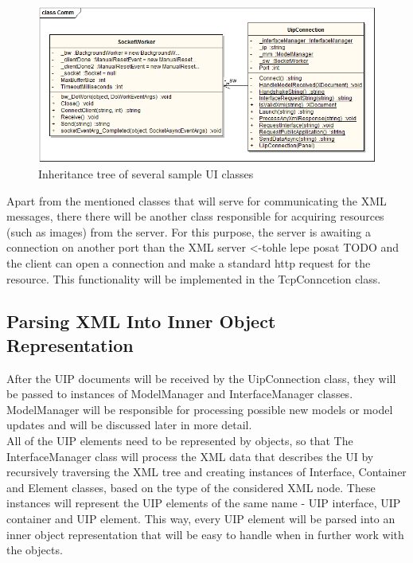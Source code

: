 \begin{figure}[ht!]
\centering
\includegraphics[width=145mm]{pics/3/classComm.png}
\caption{Inheritance tree of several sample UI classes}
\label{fig:classComm}
\end{figure}

Apart from the mentioned classes that will serve for communicating the XML messages, there there will be another class responsible for acquiring resources (such as images) from the server. For this purpose, the server is awaiting a connection on another port than the XML server <-tohle lepe posat TODO and the client can open a connection and make a standard http request for the resource. This functionality will be implemented in the TcpConncetion class.

\subsection{Parsing XML Into Inner Object Representation}
After the UIP documents will be received by the UipConnection class, they will be passed to instances of ModelManager and InterfaceManager classes. ModelManager will be responsible for processing possible new models or model updates and will be discussed later in more detail.\\
All of the UIP elements need to be represented by objects, so that 
The InterfaceManager class will process the XML data that describes the UI by recursively traversing the XML tree and creating instances of Interface, Container and Element classes, based on the type of the considered XML node. These instances will represent the UIP elements of the same name - UIP interface, UIP container and UIP element. This way, every UIP element will be parsed into an inner object representation that will be easy to handle when in further work with the objects.

